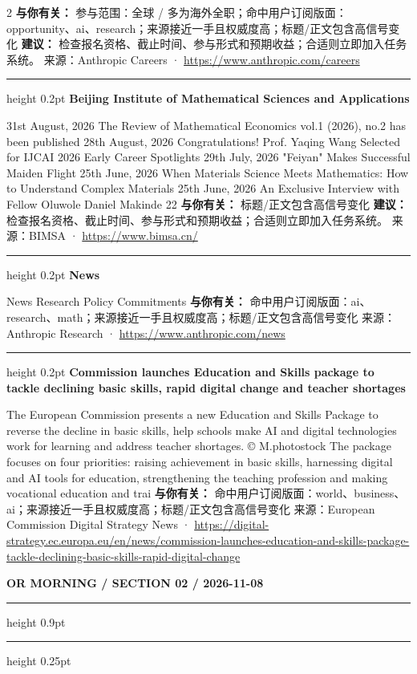 \documentclass[10.5pt]{ctexart}
\begin{document}
\begin{multicols}{2}
\textbf{与你有关：} 参与范围：全球 / 多为海外全职；命中用户订阅版面：opportunity、ai、research；来源接近一手且权威度高；标题/正文包含高信号变化
\textbf{建议：} 检查报名资格、截止时间、参与形式和预期收益；合适则立即加入任务系统。
{\footnotesize\color{ormuted} 来源：Anthropic Careers · \url{https://www.anthropic.com/careers}}
\vspace{2mm}
\hrule height 0.2pt
\vspace{2mm}
{\large\bfseries Beijing Institute of Mathematical Sciences and Applications}\par
31st August, 2026 The Review of Mathematical Economics vol.1 (2026), no.2 has been published 28th August, 2026 Congratulations! Prof. Yaqing Wang Selected for IJCAI 2026 Early Career Spotlights 29th July, 2026 "Feiyan" Makes Successful Maiden Flight 25th June, 2026 When Materials Science Meets Mathematics: How to Understand Complex Materials 25th June, 2026 An Exclusive Interview with Fellow Oluwole Daniel Makinde 22
\textbf{与你有关：} 标题/正文包含高信号变化
\textbf{建议：} 检查报名资格、截止时间、参与形式和预期收益；合适则立即加入任务系统。
{\footnotesize\color{ormuted} 来源：BIMSA · \url{https://www.bimsa.cn/}}
\vspace{2mm}
\hrule height 0.2pt
\vspace{2mm}
{\large\bfseries News}\par
News Research Policy Commitments
\textbf{与你有关：} 命中用户订阅版面：ai、research、math；来源接近一手且权威度高；标题/正文包含高信号变化
{\footnotesize\color{ormuted} 来源：Anthropic Research · \url{https://www.anthropic.com/news}}
\vspace{2mm}
\hrule height 0.2pt
\vspace{2mm}
{\large\bfseries Commission launches Education and Skills package to tackle declining basic skills, rapid digital change and teacher shortages}\par
The European Commission presents a new Education and Skills Package to reverse the decline in basic skills, help schools make AI and digital technologies work for learning and address teacher shortages. © M.photostock The package focuses on four priorities: raising achievement in basic skills, harnessing digital and AI tools for education, strengthening the teaching profession and making vocational education and trai
\textbf{与你有关：} 命中用户订阅版面：world、business、ai；来源接近一手且权威度高；标题/正文包含高信号变化
{\footnotesize\color{ormuted} 来源：European Commission Digital Strategy News · \url{https://digital-strategy.ec.europa.eu/en/news/commission-launches-education-and-skills-package-tackle-declining-basic-skills-rapid-digital-change}}
\end{multicols}
\newpage
{\small\bfseries OR MORNING / SECTION 02 / 2026-11-08}
\vspace{2mm}
\hrule height 0.9pt
\vspace{1.5mm}
\hrule height 0.25pt
\vspace{4mm}
\end{document}

